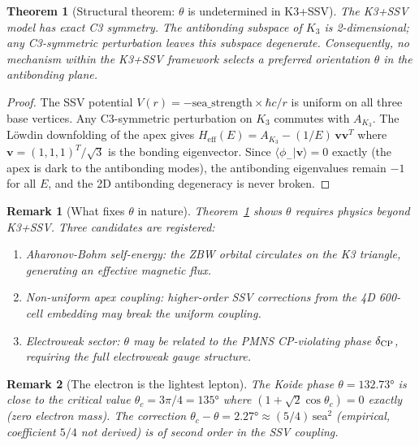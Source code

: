 \documentclass[11pt]{article}
\newtheorem{theorem}{Theorem}[section]
\newtheorem{remark}{Remark}[section]
\begin{document}
\begin{theorem}[Structural theorem: $\theta$ is undetermined in K3+SSV]
\label{thm:theta_free}
The K3+SSV model has exact C3 symmetry.  The antibonding subspace
of $K_3$ is 2-dimensional; any C3-symmetric perturbation leaves this
subspace degenerate.  Consequently, no mechanism within the K3+SSV
framework selects a preferred orientation $\theta$ in the antibonding
plane.
\end{theorem}

\begin{proof}
The SSV potential $V(r) = -\mathrm{sea\_strength}\times\hbar c/r$ is
uniform on all three base vertices.  Any C3-symmetric perturbation on
$K_3$ commutes with $A_{K_3}$.  The L\"{o}wdin downfolding of the apex
gives $H_\mathrm{eff}(E) = A_{K_3} - (1/E)\,\mathbf{v}\mathbf{v}^T$
where $\mathbf{v} = (1,1,1)^T/\sqrt{3}$ is the bonding eigenvector.
Since $\langle\phi_-|\mathbf{v}\rangle = 0$ exactly (the apex is dark
to the antibonding modes), the antibonding eigenvalues remain $-1$
for all $E$, and the 2D antibonding degeneracy is never broken.
\end{proof}

\begin{remark}[What fixes $\theta$ in nature]
Theorem~\ref{thm:theta_free} shows $\theta$ requires physics beyond
K3+SSV.  Three candidates are registered:
\begin{enumerate}
\item \emph{Aharonov-Bohm self-energy}: the ZBW orbital circulates on
  the K3 triangle, generating an effective magnetic flux.
\item \emph{Non-uniform apex coupling}: higher-order SSV corrections
  from the 4D 600-cell embedding may break the uniform coupling.
\item \emph{Electroweak sector}: $\theta$ may be related to the PMNS
  CP-violating phase $\delta_{\rm CP}$, requiring the full electroweak
  gauge structure.
\end{enumerate}
\end{remark}

\begin{remark}[The electron is the lightest lepton]
The Koide phase $\theta = 132.73°$ is close to the critical value
$\theta_c = 3\pi/4 = 135°$ where $(1+\sqrt{2}\cos\theta_c) = 0$
exactly (zero electron mass).  The correction
$\theta_c - \theta = 2.27° \approx (5/4)\,\mathrm{sea}^2$ (empirical,
coefficient $5/4$ not derived) is of second order in the SSV coupling.
\end{remark}
\end{document}

